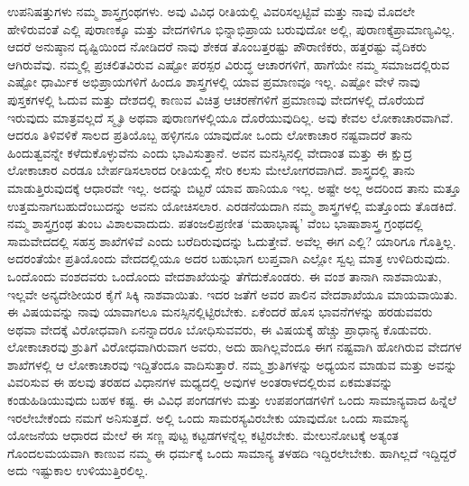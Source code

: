 ಉಪನಿಷತ್ತುಗಳು ನಮ್ಮ ಶಾಸ್ತ್ರಗ್ರಂಥಗಳು. ಅವು ವಿವಿಧ ರೀತಿಯಲ್ಲಿ ವಿವರಿಸಲ್ಪಟ್ಟಿವೆ ಮತ್ತು ನಾವು ಮೊದಲೇ ಹೇಳಿರುವಂತೆ ಎಲ್ಲಿ ಪುರಾಣಕ್ಕೂ ಮತ್ತು ವೇದಗಳಿಗೂ ಭಿನ್ನಾಭಿಪ್ರಾಯ ಬರುವುದೋ ಅಲ್ಲಿ, ಪುರಾಣಕ್ಕೆ\break ಪ್ರಾಮಾಣ್ಯವಿಲ್ಲ. ಆದರೆ ಅನುಷ್ಠಾನ ದೃಷ್ಟಿಯಿಂದ ನೋಡಿದರೆ ನಾವು ಶೇಕಡ ತೊಂಬತ್ತರಷ್ಟು ಪೌರಾಣಿಕರು, ಹತ್ತರಷ್ಟು ವೈದಿಕರು ಆಗಿರುವೆವು. ನಮ್ಮಲ್ಲಿ ಪ್ರಚಲಿತವಿರುವ ಎಷ್ಟೋ ಪರಸ್ಪರ ವಿರುದ್ಧ ಆಚಾರಗಳಿಗೆ, ಹಾಗೆಯೇ ನಮ್ಮ ಸಮಾಜದಲ್ಲಿರುವ ಎಷ್ಟೋ ಧಾರ್ಮಿಕ ಅಭಿಪ್ರಾಯಗಳಿಗೆ ಹಿಂದೂ ಶಾಸ್ತ್ರಗಳಲ್ಲಿ ಯಾವ ಪ್ರಮಾಣವೂ ಇಲ್ಲ. ಎಷ್ಟೋ ವೇಳೆ ನಾವು ಪುಸ್ತಕಗಳಲ್ಲಿ ಓದುವ ಮತ್ತು ದೇಶದಲ್ಲಿ ಕಾಣುವ ವಿಚಿತ್ರ ಆಚರಣೆಗಳಿಗೆ ಪ್ರಮಾಣವು ವೇದಗಳಲ್ಲಿ ದೊರೆಯದೆ ಇರುವುದು ಮಾತ್ರವಲ್ಲದೆ ಸ್ಮೃತಿ ಅಥವಾ ಪುರಾಣಗಳಲ್ಲಿಯೂ ದೊರೆಯುವುದಿಲ್ಲ. ಅವು ಕೇವಲ ಲೋಕಾಚಾರವಾಗಿವೆ. ಆದರೂ ತಿಳಿವಳಿಕೆ ಸಾಲದ ಪ್ರತಿಯೊಬ್ಬ ಹಳ್ಳಿಗನೂ ಯಾವುದೋ ಒಂದು ಲೋಕಾಚಾರ ನಷ್ಟವಾದರೆ ತಾನು ಹಿಂದುತ್ವವನ್ನೇ ಕಳೆದುಕೊಳ್ಳುವೆನು ಎಂದು ಭಾವಿಸುತ್ತಾನೆ. ಅವನ ಮನಸ್ಸಿನಲ್ಲಿ ವೇದಾಂತ ಮತ್ತು ಈ ಕ್ಷುದ್ರ ಲೋಕಾಚಾರ ಎರಡೂ ಬೇರ್ಪಡಿಸಲಾರದ ರೀತಿಯಲ್ಲಿ ಸೇರಿ ಕಲಸು ಮೇಲೋಗರವಾಗಿದೆ. ಶಾಸ್ತ್ರದಲ್ಲಿ ತಾನು ಮಾಡುತ್ತಿರುವುದಕ್ಕೆ ಆಧಾರವೇ ಇಲ್ಲ. ಅದನ್ನು ಬಿಟ್ಟರೆ ಯಾವ ಹಾನಿಯೂ ಇಲ್ಲ. ಅಷ್ಟೇ ಅಲ್ಲ ಅದರಿಂದ ತಾನು ಮತ್ತೂ ಉತ್ತಮನಾಗಬಹುದೆಂಬುದನ್ನು ಅವನು ಯೋಚಿಸಲಾರ. ಎರಡನೆಯದಾಗಿ ನಮ್ಮ ಶಾಸ್ತ್ರಗಳಲ್ಲಿ ಮತ್ತೊಂದು ತೊಡಕಿದೆ. ನಮ್ಮ ಶಾಸ್ತ್ರಗ್ರಂಥ ತುಂಬ ವಿಶಾಲವಾದುದು. ಪತಂಜಲಿಪ್ರಣೀತ ‘ಮಹಾಭಾಷ್ಯ’ ವೆಂಬ ಭಾಷಾಶಾಸ್ತ್ರ ಗ್ರಂಥದಲ್ಲಿ ಸಾಮವೇದದಲ್ಲಿ ಸಹಸ್ರ ಶಾಖೆಗಳಿವೆ ಎಂದು ಬರೆದಿರುವುದನ್ನು ಓದುತ್ತೇವೆ. ಅವೆಲ್ಲ ಈಗ ಎಲ್ಲಿ? ಯಾರಿಗೂ ಗೊತ್ತಿಲ್ಲ. ಅದರಂತೆಯೇ ಪ್ರತಿಯೊಂದು ವೇದದಲ್ಲಿಯೂ ಅದರ ಬಹುಭಾಗ ಲುಪ್ತವಾಗಿ ಎಲ್ಲೋ ಸ್ವಲ್ಪ ಮಾತ್ರ ಉಳಿದಿರುವುದು. ಒಂದೊಂದು ವಂಶದವರು ಒಂದೊಂದು ವೇದಶಾಖೆಯನ್ನು ತೆಗೆದುಕೊಂಡರು. ಈ ವಂಶ ತಾನಾಗಿ ನಾಶವಾಯಿತು, ಇಲ್ಲವೇ ಅನ್ಯದೇಶೀಯರ ಕೈಗೆ ಸಿಕ್ಕಿ ನಾಶವಾಯಿತು. ಇದರ ಜತೆಗೆ ಅವರ ಪಾಲಿನ ವೇದಶಾಖೆಯೂ ಮಾಯವಾಯಿತು. ಈ ವಿಷಯವನ್ನು ನಾವು ಯಾವಾಗಲೂ ಮನಸ್ಸಿನಲ್ಲಿಟ್ಟಿರಬೇಕು. ಏಕೆಂದರೆ ಹೊಸ ಭಾವನೆಗಳನ್ನು ಹರಡುವವರು ಅಥವಾ ವೇದಕ್ಕೆ ವಿರೋಧವಾಗಿ ಏನನ್ನಾದರೂ ಬೋಧಿಸುವವರು, ಈ ವಿಷಯಕ್ಕೆ ಹೆಚ್ಚು ಪ್ರಾಧಾನ್ಯ ಕೊಡುವರು. ಲೋಕಾಚಾರವು ಶ್ರುತಿಗೆ ವಿರೋಧವಾಗಿರುವಾಗ ಅವರು, ಅದು ಹಾಗಿಲ್ಲವೆಂದೂ ಈಗ ನಷ್ಟವಾಗಿ ಹೋಗಿರುವ ವೇದಗಳ ಶಾಖೆಗಳಲ್ಲಿ ಆ ಲೋಕಾಚಾರವು ಇದ್ದಿತೆಂದೂ ವಾದಿಸುತ್ತಾರೆ. ನಮ್ಮ ಶ್ರುತಿಗಳನ್ನು ಅಧ್ಯಯನ ಮಾಡುವ ಮತ್ತು ಅವನ್ನು ವಿವರಿಸುವ ಈ ಹಲವು ತರಹದ ವಿಧಾನಗಳ ಮಧ್ಯದಲ್ಲಿ ಅವುಗಳ ಅಂತರಾಳದಲ್ಲಿರುವ ಏಕಮತವನ್ನು ಕಂಡುಹಿಡಿಯುವುದು ಬಹಳ ಕಷ್ಟ. ಈ ವಿವಿಧ ಪಂಗಡಗಳು ಮತ್ತು ಉಪಪಂಗಡಗಳಿಗೆ ಒಂದು ಸಾಮಾನ್ಯವಾದ ಹಿನ್ನೆಲೆ ಇರಲೇಬೇಕೆಂದು ನಮಗೆ ಅನಿಸುತ್ತದೆ. ಅಲ್ಲಿ ಒಂದು ಸಾಮರಸ್ಯವಿರಬೇಕು ಯಾವುದೋ ಒಂದು ಸಾಮಾನ್ಯ ಯೋಜನೆಯ ಆಧಾರದ ಮೇಲೆ ಈ ಸಣ್ಣ ಪುಟ್ಟ ಕಟ್ಟಡಗಳನ್ನೆಲ್ಲ ಕಟ್ಟಿರಬೇಕು. ಮೇಲುನೋಟಕ್ಕೆ ಅತ್ಯಂತ ಗೊಂದಲಮಯವಾಗಿ ಕಾಣುವ ನಮ್ಮ ಈ ಧರ್ಮಕ್ಕೆ ಒಂದು ಸಾಮಾನ್ಯ ತಳಹದಿ ಇದ್ದಿರಲೇಬೇಕು. ಹಾಗಿಲ್ಲದೆ ಇದ್ದಿದ್ದರೆ ಅದು ಇಷ್ಟುಕಾಲ ಉಳಿಯುತ್ತಿರಲಿಲ್ಲ.

